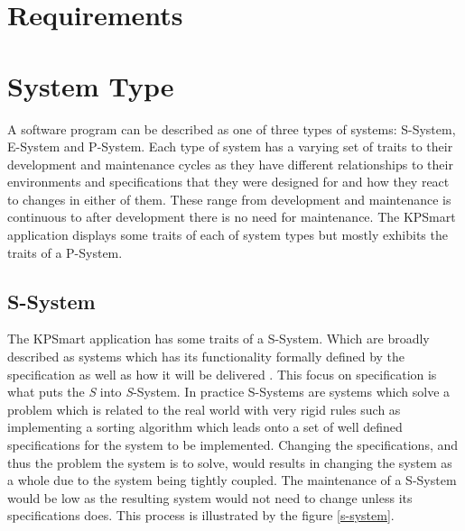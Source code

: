 \documentclass{style/CRPITStyle}
\renewcommand{\cite}{\citep}
\begin{document}
\section{Requirements}

\section{System Type}

A software program can be described as one of three types of systems:
S-System, E-System and P-System. Each type of system has a varying set of traits
to their development and maintenance cycles as they have different relationships
to their environments and specifications that they were designed for and how
they react to changes in either of them. These range from development
and maintenance is continuous to after development there is no need for
maintenance. The KPSmart application displays some traits of each of system
types but mostly exhibits the traits of a P-System.

\subsection{S-System}

The KPSmart application has some traits of a S-System. Which are broadly described as
systems which has its functionality formally defined by the specification as
well as how it will be delivered \cite{lehman:1980}.
This focus on specification is what puts the \emph{S} into \emph{S}-System.
In practice S-Systems are systems which solve a problem which is related to the real world
with very rigid rules such as implementing a sorting algorithm which leads onto a set of well defined
specifications for the system to be implemented.
Changing the specifications, and thus the problem the system is to solve,
would results in changing the system as a whole due to the system being tightly
coupled. The maintenance of a S-System would be low as the resulting system
would not need to change unless its specifications does.
This process is illustrated by the figure \ref{s-system}.
\end{document}
